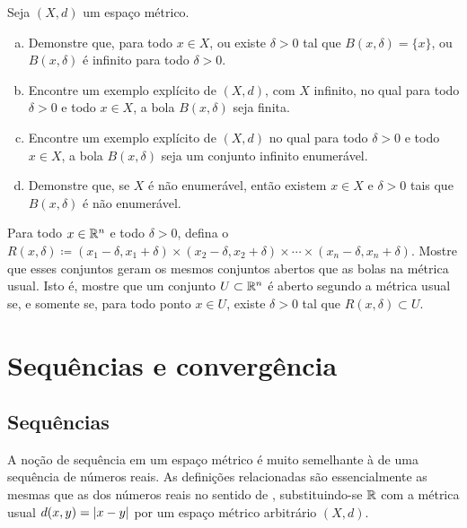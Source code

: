 \begin{samepage}
\begin{exercise}
Seja $(X,d)$ um espaço métrico.
\begin{enumerate}[a)]
\item
Demonstre que, para todo $x \in X$, ou existe $\delta > 0$ tal que
$B(x,\delta) = \{ x \}$, ou $B(x,\delta)$ é infinito para todo $\delta > 0$.
\item
Encontre um exemplo explícito de $(X,d)$, com $X$ infinito, no qual
para todo $\delta > 0$ e todo $x \in X$, a bola $B(x,\delta)$ seja finita.
\item
Encontre um exemplo explícito de $(X,d)$ no qual
para todo $\delta > 0$ e todo $x \in X$, a bola $B(x,\delta)$ seja um
conjunto infinito enumerável.
\item
Demonstre que, se $X$ é não enumerável, então existem $x \in X$ e
$\delta > 0$ tais que $B(x,\delta)$ é não enumerável.
\end{enumerate}
\end{exercise}
\end{samepage}

\begin{exercise}
Para todo $x \in {\mathbb{R}}^n$ e todo $\delta > 0$, defina o 
$R(x,\delta) \coloneqq
(x_1-\delta,x_1+\delta) \times
(x_2-\delta,x_2+\delta) \times \cdots \times
(x_n-\delta,x_n+\delta)$. Mostre que esses conjuntos geram os mesmos
conjuntos abertos que as bolas na métrica usual. Isto é, mostre que um
conjunto $U \subset {\mathbb{R}}^n$ é aberto segundo a métrica usual se, e somente se,
para todo ponto $x \in U$, existe $\delta > 0$ tal que
$R(x,\delta) \subset U$.
\end{exercise}


\sectionnewpage
\section{Sequências e convergência}
\label{sec:metseqs}



\subsection{Sequências}

A noção de sequência em um espaço métrico é muito semelhante à de uma
sequência de números reais.
As definições relacionadas são essencialmente as mesmas que as dos números
reais no sentido de , substituindo-se ${\mathbb{R}}$ com
a métrica usual $d(x,y)=\lvert {x-y} \rvert$
por um espaço métrico arbitrário $(X,d)$.

